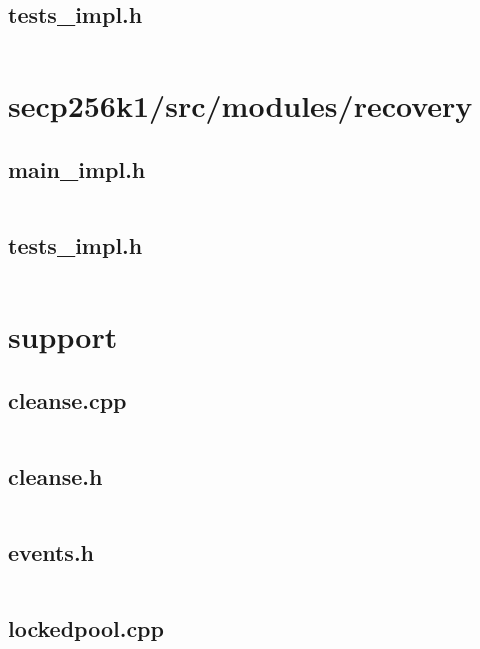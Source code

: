 \documentclass{article}
\begin{document}
\subsection{tests\_impl.h}
\inputminted{cpp}{/home/dufferzafar/dev/@clones/bitcoin/src/secp256k1/src/modules/ecdh/tests_impl.h}
\newpage

\section{secp256k1/src/modules/recovery}

\subsection{main\_impl.h}
\inputminted{cpp}{/home/dufferzafar/dev/@clones/bitcoin/src/secp256k1/src/modules/recovery/main_impl.h}
\newpage

\subsection{tests\_impl.h}
\inputminted{cpp}{/home/dufferzafar/dev/@clones/bitcoin/src/secp256k1/src/modules/recovery/tests_impl.h}
\newpage

\section{support}

\subsection{cleanse.cpp}
\inputminted{cpp}{/home/dufferzafar/dev/@clones/bitcoin/src/support/cleanse.cpp}
\newpage

\subsection{cleanse.h}
\inputminted{cpp}{/home/dufferzafar/dev/@clones/bitcoin/src/support/cleanse.h}
\newpage

\subsection{events.h}
\inputminted{cpp}{/home/dufferzafar/dev/@clones/bitcoin/src/support/events.h}
\newpage

\subsection{lockedpool.cpp}
\inputminted{cpp}{/home/dufferzafar/dev/@clones/bitcoin/src/support/lockedpool.cpp}
\newpage
\end{document}
